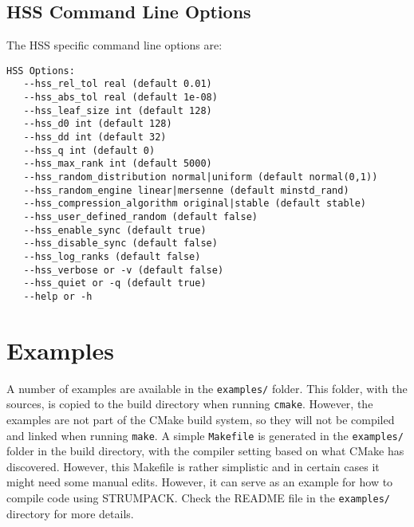\documentclass{article}
\begin{document}
\subsection{HSS Command Line Options}
The HSS specific command line options are:
\begin{lstlisting}[style=Bash]
 HSS Options:
   --hss_rel_tol real (default 0.01)
   --hss_abs_tol real (default 1e-08)
   --hss_leaf_size int (default 128)
   --hss_d0 int (default 128)
   --hss_dd int (default 32)
   --hss_q int (default 0)
   --hss_max_rank int (default 5000)
   --hss_random_distribution normal|uniform (default normal(0,1))
   --hss_random_engine linear|mersenne (default minstd_rand)
   --hss_compression_algorithm original|stable (default stable)
   --hss_user_defined_random (default false)
   --hss_enable_sync (default true)
   --hss_disable_sync (default false)
   --hss_log_ranks (default false)
   --hss_verbose or -v (default false)
   --hss_quiet or -q (default true)
   --help or -h
\end{lstlisting}


\section{Examples}\label{sec:examples}
A number of examples are available in the
\lstinline[style=Bash]!examples/! folder. This folder, with the
sources, is copied to the build directory when running
\lstinline[style=Bash]!cmake!. However, the examples are not part of
the CMake build system, so they will not be compiled and linked when
running \lstinline[style=Bash]!make!. A simple
\lstinline[style=Bash]!Makefile! is generated in the
\lstinline[style=Bash]!examples/! folder in the build directory, with
the compiler setting based on what CMake has discovered. However, this
Makefile is rather simplistic and in certain cases it might need some
manual edits. However, it can serve as an example for how to compile
code using STRUMPACK. Check the README file in the
\lstinline[style=Bash]!examples/! directory for more details.

\end{document}
